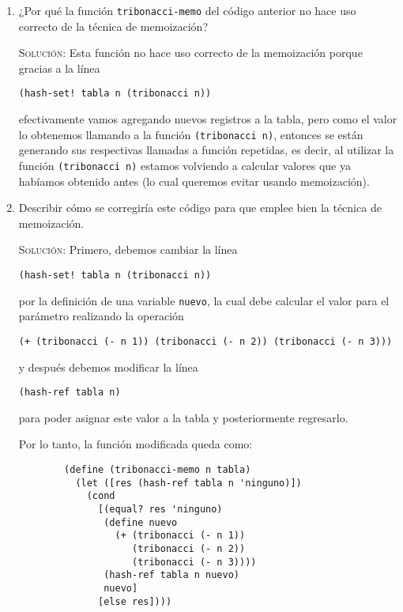 \documentclass[letterpaper,11pt]{article}
\begin{document}
\begin{enumerate}
    \begin{enumerate}
        \item ¿Por qué la función \texttt{tribonacci-memo} del código anterior 
        no hace uso correcto de la técnica de memoización?

        \textsc{Solución:} Esta función no hace uso correcto de la memoización
        porque gracias a la línea 
        \begin{center}
            \texttt{(hash-set! tabla n (tribonacci n))}
        \end{center}

        efectivamente vamos agregando nuevos registros a la tabla, pero como 
        el valor lo obtenemos llamando a la función \texttt{(tribonacci n)}, 
        entonces se están generando sus respectivas llamadas a función 
        repetidas, es decir, al utilizar la función \texttt{(tribonacci n)} 
        estamos volviendo a calcular valores que ya habíamos obtenido antes 
        (lo cual queremos evitar usando memoización).

        \item Describir cómo se corregiría este código para que emplee bien la 
        técnica de memoización.
        
        \textsc{Solución:} Primero, debemos cambiar la línea 
        \begin{center}
            \texttt{(hash-set! tabla n (tribonacci n))}    
        \end{center}

        por la definición de una variable \texttt{nuevo}, la cual debe calcular 
        el valor para el parámetro realizando la operación
        \begin{center}
            \texttt{(+ (tribonacci (- n 1)) (tribonacci (- n 2)) 
            (tribonacci (- n 3)))}
        \end{center}
        
        y después debemos modificar la línea
        \begin{center}
            \texttt{(hash-ref tabla n)}
        \end{center}

        para poder asignar este valor a la tabla y posteriormente regresarlo.
        
        Por lo tanto, la función modificada queda como:
        \begin{verbatim}
        (define (tribonacci-memo n tabla)
          (let ([res (hash-ref tabla n 'ninguno)])
            (cond
              [(equal? res 'ninguno)
               (define nuevo 
                 (+ (tribonacci (- n 1))
                    (tribonacci (- n 2))
                    (tribonacci (- n 3))))
               (hash-ref tabla n nuevo)
               nuevo]
              [else res])))
        \end{verbatim}
    \end{enumerate}

\end{enumerate}
\end{document}
